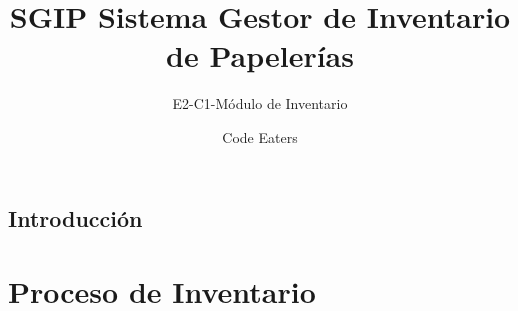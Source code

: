 \documentclass[11pt]{book}
\title{SGIP Sistema Gestor de Inventario de Papelerías}
\author{Code Eaters}
\subtitle{E2-C1-Módulo de Inventario}
\date{}
\begin{document}
\maketitle
{}
\makeProjectCharter
\makeFirmas
\tableofcontents

\chapter{Introducción}
\label{ch:Introduccion}


\part{Proceso de Inventario}
\label{ch:ProcesoInventario}

\end{document}
